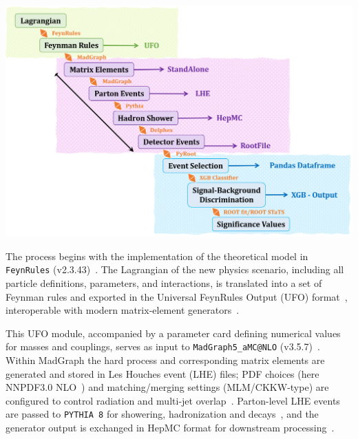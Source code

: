 \begin{center}
    \includegraphics[width=\textwidth]{Slides/2023_paper/Workflow.png}
    \label{fig:sim_workflow}
\end{center}

The process begins with the implementation of the theoretical model in \texttt{FeynRules} (v2.3.43)~\parencite{Christensen:2008py,Alloul:2013bka}. The Lagrangian of the new physics scenario, including all particle definitions, parameters, and interactions, is translated into a set of Feynman rules and exported in the Universal FeynRules Output (UFO) format~\cite{Degrande:2011ua}, interoperable with modern matrix-element generators~\cite{Alwall:2014hca}.

This UFO module, accompanied by a parameter card defining numerical values for masses and couplings, serves as input to \texttt{MadGraph5\_aMC@NLO} (v3.5.7)~\parencite{Alwall:2014bza,Alwall:2014hca}. Within MadGraph the hard process and corresponding matrix elements are generated and stored in Les Houches event (LHE) files; PDF choices (here NNPDF3.0 NLO~\parencite{NNPDF:2014otw}) and matching/merging settings (MLM/CKKW-type) are configured to control radiation and multi-jet overlap~\cite{Alwall:2007fs,Buckley:2015}. Parton-level LHE events are passed to \texttt{PYTHIA 8} for showering, hadronization and decays~\parencite{Sjostrand:2014zea}, and the generator output is exchanged in HepMC format for downstream processing~\cite{Dobbs:2001}.

